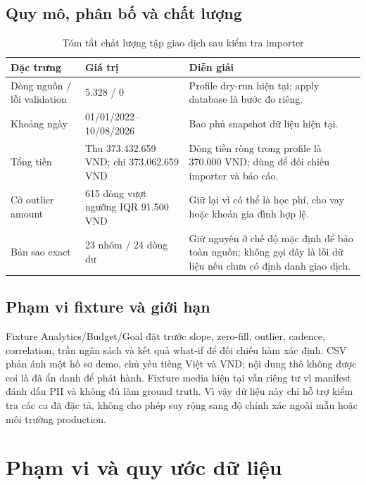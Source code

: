 \subsection{Quy mô, phân bố và chất lượng}

\begin{table}[H]
  \centering
  \caption{Tóm tắt chất lượng tập giao dịch sau kiểm tra importer}
  \label{tab:app-dataset-quality}
  \begin{tabularx}{\textwidth}{@{}L{5.0cm}R{2.8cm}Y@{}}
    \toprule
    \textbf{Đặc trưng} & \textbf{Giá trị} & \textbf{Diễn giải} \\
    \midrule
    Dòng nguồn / lỗi validation & 5.328 / 0 & Profile dry-run hiện tại; apply database là bước đo riêng. \\
    Khoảng ngày & 01/01/2022--10/08/2026 & Bao phủ snapshot dữ liệu hiện tại. \\
    Tổng tiền & Thu 373.432.659 VND; chi 373.062.659 VND & Dòng tiền ròng trong profile là 370.000 VND; dùng để đối chiếu importer và báo cáo. \\
    Cờ outlier amount & 615 dòng vượt ngưỡng IQR 91.500 VND & Giữ lại vì có thể là học phí, cho vay hoặc khoản gia đình hợp lệ. \\
    Bản sao exact & 23 nhóm / 24 dòng dư & Giữ nguyên ở chế độ mặc định để bảo toàn nguồn; không gọi đây là lỗi dữ liệu nếu chưa có định danh giao dịch. \\
    \bottomrule
  \end{tabularx}
\end{table}

\subsection{Phạm vi fixture và giới hạn}

Fixture Analytics/Budget/Goal đặt trước slope, zero-fill, outlier, cadence, correlation, trần ngân sách và kết quả what-if để đối chiếu hàm xác định. CSV phản ánh một hồ sơ demo, chủ yếu tiếng Việt và VND; nội dung thô không được coi là đã ẩn danh để phát hành. Fixture media hiện tại vẫn riêng tư vì manifest đánh dấu PII và không đủ làm ground truth. Vì vậy dữ liệu này chỉ hỗ trợ kiểm tra các ca đã đặc tả, không cho phép suy rộng sang độ chính xác ngoài mẫu hoặc môi trường production.

\section{Phạm vi và quy ước dữ liệu}
\label{app:algorithm-conventions}

